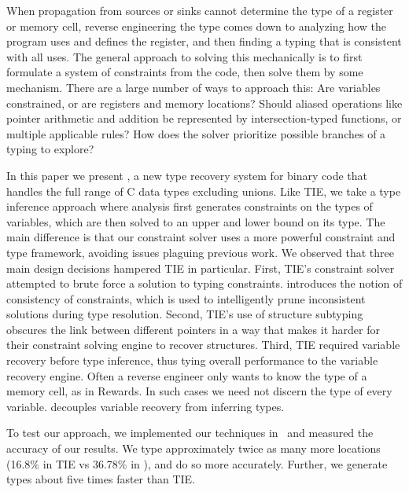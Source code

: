 When propagation from sources or sinks cannot determine the type of a register or memory cell, reverse engineering the type comes down to analyzing how the program uses and defines the register, and then finding a typing that is consistent with all uses. The general approach to solving this mechanically is to first formulate a system of constraints from the code, then solve them by some mechanism. There are a large number of ways to approach this: Are variables constrained, or are registers and memory locations? Should aliased operations like pointer arithmetic and addition be represented by intersection-typed functions, or multiple applicable rules? How does the solver prioritize possible branches of a typing to explore?


In this paper we present \bitr, a new type recovery system for binary code that handles the full range of C data types excluding unions. Like TIE, we take a type inference approach where analysis first generates constraints on the types of variables, which are then solved to an upper and lower bound on its type. The main difference is that our constraint solver uses a more powerful constraint and type framework, avoiding issues plaguing previous work. We observed that three main design decisions hampered TIE in particular. First, TIE's constraint solver attempted to brute force a solution to typing constraints. \bitr{} introduces the notion of consistency of constraints, which is used to intelligently prune inconsistent solutions during type resolution.  Second, TIE's use of structure subtyping obscures the link between different pointers in a way that makes it harder for their constraint solving engine to recover structures. Third, TIE required variable recovery before type inference, thus tying overall performance to the variable recovery engine. Often a reverse engineer only wants to know the type of a memory cell, as in Rewards.  In such cases we need not discern the type of every variable. \bitr{} decouples variable recovery from inferring types.


  To test our approach, we implemented our techniques in \bitr\ and measured the accuracy of our results. We type approximately twice as many more locations (16.8\% in TIE vs 36.78\% in \bitr), and do so more accurately. Further, we generate types about five times faster than TIE.



